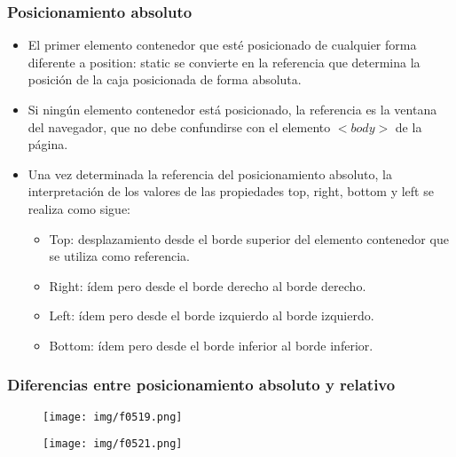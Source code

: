 \begin{frame}
\frametitle{Posicionamiento absoluto}

\begin{itemize}
  \item El primer elemento contenedor que esté posicionado de cualquier forma diferente a position: static se convierte en la referencia que determina la posición de la caja posicionada de forma absoluta.
  \item Si ningún elemento contenedor está posicionado, la referencia es la ventana del navegador, que no debe confundirse con el elemento $<body>$ de la página.
  \item Una vez determinada la referencia del posicionamiento absoluto, la interpretación de los valores de las propiedades top, right, bottom y left se realiza como sigue:
  \begin{itemize}
    \item Top: desplazamiento desde el borde superior del elemento contenedor que se utiliza como referencia.
    \item Right: ídem pero desde el borde derecho al borde derecho.
    \item Left:  ídem pero desde el borde izquierdo al borde izquierdo.
    \item Bottom: ídem pero desde el borde inferior al borde inferior.
  \end{itemize}
\end{itemize}

\end{frame}



\begin{frame}
\frametitle{Diferencias entre posicionamiento absoluto y relativo}

\begin{center}
\begin{figure}[p]
\texttt{[image: img/f0519.png]}
\end{figure}
\end{center}

\begin{center}
\begin{figure}[p]
\texttt{[image: img/f0521.png]}
\end{figure}
\end{center}

\end{frame}


